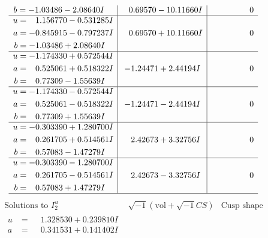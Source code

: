 \documentclass[1p]{elsarticle_modified}
\theoremstyle{definition}
\newcommand{\I}{\sqrt{-1}}
\begin{document}
$$\begin{array}{c|c|c}
\begin{aligned}
b &= -1.03486 - 2.08640 I\end{aligned}
 & \phantom{-}0.69570 - 10.11660 I & \phantom{-0.000000 } 0 \\ \hline\begin{aligned}
u &= \phantom{-}1.156770 - 0.531285 I \\
a &= -0.845915 - 0.797237 I \\
b &= -1.03486 + 2.08640 I\end{aligned}
 & \phantom{-}0.69570 + 10.11660 I & \phantom{-0.000000 } 0 \\ \hline\begin{aligned}
u &= -1.174330 + 0.572544 I \\
a &= \phantom{-}0.525061 + 0.518322 I \\
b &= \phantom{-}0.77309 - 1.55639 I\end{aligned}
 & -1.24471 + 2.44194 I & \phantom{-0.000000 } 0 \\ \hline\begin{aligned}
u &= -1.174330 - 0.572544 I \\
a &= \phantom{-}0.525061 - 0.518322 I \\
b &= \phantom{-}0.77309 + 1.55639 I\end{aligned}
 & -1.24471 - 2.44194 I & \phantom{-0.000000 } 0 \\ \hline\begin{aligned}
u &= -0.303390 + 1.280700 I \\
a &= \phantom{-}0.261705 + 0.514561 I \\
b &= \phantom{-}0.57083 - 1.47279 I\end{aligned}
 & \phantom{-}2.42673 + 3.32756 I & \phantom{-0.000000 } 0 \\ \hline\begin{aligned}
u &= -0.303390 - 1.280700 I \\
a &= \phantom{-}0.261705 - 0.514561 I \\
b &= \phantom{-}0.57083 + 1.47279 I\end{aligned}
 & \phantom{-}2.42673 - 3.32756 I & \phantom{-0.000000 } 0\\
 \hline 
 \end{array}$$\newpage$$\begin{array}{c|c|c}  
\text{Solutions to }I^u_{2}& \I (\text{vol} + \sqrt{-1}CS) & \text{Cusp shape}\\
 \hline 
\begin{aligned}
u &= \phantom{-}1.328530 + 0.239810 I \\
a &= \phantom{-}0.341531 + 0.141402 I \\

\end{aligned}
\end{array}$$
\end{document}
